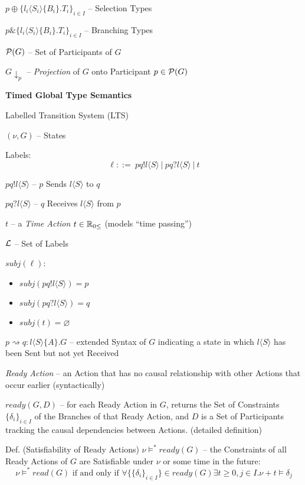 $p \oplus \{l_i\langle{S_i}\rangle\{B_i\}.T_i\}_{i \in I}$ --
Selection Types

$p \& \{l_i\langle{S_i}\rangle\{B_i\}.T_i\}_{i \in I}$ -- Branching
Types

$\mathcal{P}(G)$ -- Set of Participants of $G$

$G\downarrow_p$ -- \emph{Projection} of $G$ onto Participant $p \in
\mathcal{P}(G)$


\textbf{Timed Global Type Semantics}

Labelled Transition System (LTS)

$(\nu, G)$ -- States

Labels:
\[
  \ell ::=\ pq!l\langle{S}\rangle \ |\ pq?l\langle{S}\rangle \ |\ t
\]

$pq!l\langle{S}\rangle$ -- $p$ Sends $l\langle{S}\rangle$ to $q$

$pq?l\langle{S}\rangle$ -- $q$ Receives $l\langle{S}\rangle$ from $p$

$t$ -- a \emph{Time Action} $t \in \mathbb{R}_{0\leq}$ (models ``time
passing'')

$\mathcal{L}$ -- Set of Labels

$subj(\ell)$:
\begin{itemize}
  \item $subj(pq!l\langle{S}\rangle) = p$
  \item $subj(pq?l\langle{S}\rangle) = q$
  \item $subj(t) = \varnothing$
\end{itemize}

$p \rightsquigarrow q : l\langle{S}\rangle\{A\}.G$ -- extended Syntax
of $G$ indicating a state in which $l\langle{S}\rangle$ has been Sent
but not yet Received

\emph{Ready Action} -- an Action that has no causal relationship with
other Actions that occur earlier (syntactically)

$ready(G,D)$ -- for each Ready Action in $G$, returns the Set of
Constraints $\{\delta_i\}_{i\in I}$ of the Branches of that Ready
Action, and $D$ is a Set of Participants tracking the causal
dependencies between Actions. (detailed definition) %

Def. (Satisfiability of Ready Actions) $\nu \vDash^* ready(G)$ -- the
Constraints of all Ready Actions of $G$ are Satisfiable under $\nu$ or
some time in the future:
\[
  \nu \vDash^* read(G) \text{ if and only if }
    \forall\{\{\delta_i\}_{i \in I}\} \in ready(G) \exists t \geq 0,
    j \in I . \nu + t \vDash \delta_j
\]

